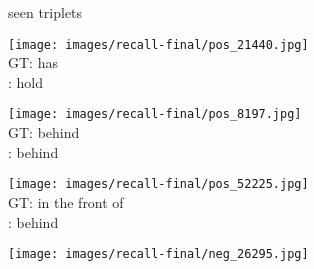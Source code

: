 \documentclass[10pt,twocolumn,letterpaper]{article}
\begin{document}
\begin{figure*}[t]
	\begin{minipage}[b]{0.005\textwidth}
    	\centering
    	\begin{turn}{90}
    	seen triplets
    	\end{turn}
    	\vspace{3.5ex}
    \end{minipage}
    \hspace{0.01\textwidth}
	\begin{minipage}[b]{0.18\textwidth}
    	\centering
       	\texttt{[image: images/recall-final/pos\_21440.jpg]}\\
       	\vspace{0.2ex}
       	\small{
       	GT: has\\
       	\cite{Lu16}: hold
       	}
       	\vspace{0.3ex}
    \end{minipage}
    \hspace{0.005\textwidth}      
	\begin{minipage}[b]{0.18\textwidth}
    	\centering
       	\texttt{[image: images/recall-final/pos\_8197.jpg]}\\
       	\vspace{0.2ex}
       	\small{
       	GT: behind\\
       	\cite{Lu16}: behind
       	}
       	\vspace{0.3ex}
    \end{minipage}
    \hspace{0.005\textwidth}
	\begin{minipage}[b]{0.18\textwidth}
    	\centering
       	\texttt{[image: images/recall-final/pos\_52225.jpg]}\\
       	\vspace{0.2ex}
       	\small{
       	GT: in the front of\\
       	\cite{Lu16}: behind
       	} 
       	\vspace{0.3ex}
    \end{minipage}
    \hspace{0.005\textwidth}
    \begin{minipage}[b]{0.18\textwidth}
    	\centering
      	\texttt{[image: images/recall-final/neg\_26295.jpg]}\\

\end{minipage}
\end{figure*}
\end{document}
